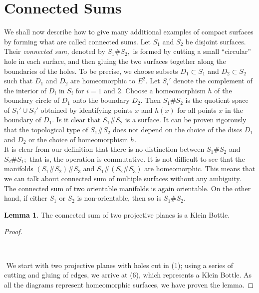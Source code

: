 \documentclass{article}
\theoremstyle{definition}
\newtheorem{lem}[theorem]{Lemma}
\begin{document}
\section{Connected Sums}
We shall now describe how to give many additional examples of compact surfaces by forming what are called connected sums. Let $S_1$ and $S_2$ be disjoint surfaces. Their \emph{connected sum,} denoted by $S_1 \# S_2,$ is formed by cutting a small ``circular'' hole in each surface, and then gluing the two surfaces together along the boundaries of the holes. To be precise, we choose subsets $D_1 \subset S_1$ and $D_2 \subset S_2$ such that $D_1$ and $D_2$ are homeomorphic to $E^2.$ Let $S_i'$ denote the complement of the interior of $D_i$ in $S_i$ for $i=1$ and $2.$ Choose a homeomorphism $h$ of the boundary circle of $D_1$ onto the boundary $D_2.$ Then $S_1 \# S_2$ is the quotient space of $S_1'\cup S_2'$ obtained by identifying points $x$ and $h(x)$ for all points $x$ in the boundary of $D_1.$ Is it clear that $S_1\# S_2$ is a surface. It can be proven rigorously that the topological type of $S_1\# S_2$ does not depend on the choice of the discs $D_1$ and $D_2$ or the choice of homeomorphism $h.$\\
It is clear from our definition that there is no distinction between $S_1 \# S_2$ and $S_2 \# S_1;$ that is, the operation is commutative. It is not difficult to see that the manifolds $(S_1 \# S_2) \# S_3$ and $S_1 \# (S_2 \# S_3)$ are homeomorphic. This means that we can talk about connected sum of multiple surfaces without any ambiguity.\\
The connected sum of two orientable manifolds is again orientable. On the other hand, if either $S_1$ or $S_2$ is non-orientable, then so is $S_1 \# S_2.$
%
\begin{lem}
  The connected sum of two projective planes is a Klein Bottle.
\end{lem}
\begin{proof} $ $\newline
  \begin{adjustwidth}{-20mm}{-20mm}
    \begin{center}
      
      

      
      

      
      \\
    \end{center}
  \end{adjustwidth}
$ $\newline
We start with two projective planes with holes cut in (1); using a series of cutting and gluing of edges, we arrive at (6), which represents a Klein Bottle. As all the diagrams represent homeomorphic surfaces, we have proven the lemma. 
\end{proof}
\end{document}
